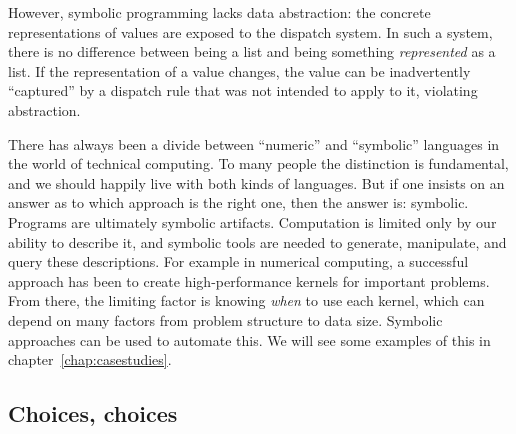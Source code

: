 However, symbolic programming lacks data abstraction: the concrete
representations of values are exposed to the dispatch system.
In such a system, there is no difference between being a list and being
something \emph{represented} as a list.
If the representation of a value changes, the value can be inadvertently
``captured'' by a dispatch rule that was not intended to apply to it,
violating abstraction.

There has always been a divide between ``numeric'' and ``symbolic''
languages in the world of technical computing.
To many people the distinction is fundamental, and we should happily live
with both kinds of languages.
But if one insists on an answer as to which approach is the right one,
then the answer is: symbolic.
Programs are ultimately symbolic artifacts.
Computation is limited only by our ability to describe it, and
symbolic tools are needed to generate, manipulate, and query these
descriptions.
For example in numerical computing, a successful approach has been to
create high-performance kernels for important problems.
From there, the limiting factor is knowing \emph{when} to use each
kernel, which can depend on many factors from problem structure to
data size.
Symbolic approaches can be used to automate this.
We will see some examples of this in chapter~\ref{chap:casestudies}.

\subsection{Choices, choices}
\label{sec:choices}

\newcommand{\chk}{{\Large \checkmark}}

